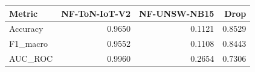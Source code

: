 \begin{tabular}{lrrr}
\toprule
Metric & NF-ToN-IoT-V2 & NF-UNSW-NB15 & Drop \\
\midrule
Accuracy & 0.9650 & 0.1121 & 0.8529 \\
F1_macro & 0.9552 & 0.1108 & 0.8443 \\
AUC_ROC & 0.9960 & 0.2654 & 0.7306 \\
\bottomrule
\end{tabular}
